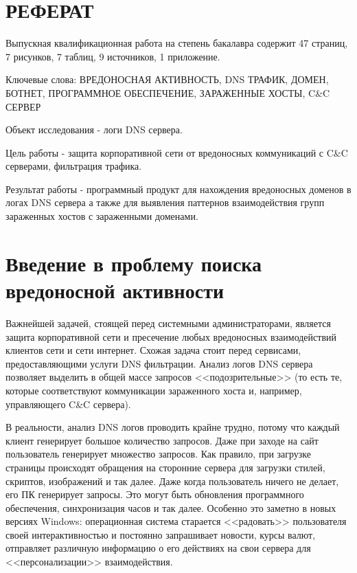 \documentclass[a4paper,14pt]{extreport} %
\begin{document}
\newpage
\clearpage
{}
\chapter*{РЕФЕРАТ}
Выпускная квалификационная работа на степень бакалавра содержит 47 страниц, 7 рисунков, 7 таблиц, 9 источников, 1 приложение.
\newline

Ключевые слова: ВРЕДОНОСНАЯ АКТИВНОСТЬ, DNS ТРАФИК, ДОМЕН, БОТНЕТ, ПРОГРАММНОЕ ОБЕСПЕЧЕНИЕ, ЗАРАЖЕННЫЕ ХОСТЫ, C\&C СЕРВЕР
\newline

Объект исследования - логи DNS сервера.

Цель работы - защита корпоративной сети от вредоносных коммуникаций с C\&C серверами, фильтрация трафика.

Результат работы - программный продукт для нахождения вредоносных доменов в логах DNS сервера а также для выявления паттернов взаимодействия групп зараженных хостов с зараженными доменами.


\renewcommand\contentsname{Содержание}

\tableofcontents



\chapter{Введение в проблему поиска вредоносной активности}

Важнейшей задачей, стоящей перед системными администраторами, является защита корпоративной сети и пресечение любых вредоносных взаимодействий клиентов сети и сети интернет. Схожая задача стоит перед сервисами, предоставляющими услуги DNS фильтрации. Анализ логов DNS сервера позволяет выделить в общей массе запросов <<подозрительные>> (то есть те, которые соответствуют коммуникации зараженного хоста и, например, управляющего C\&C сервера). 

В реальности, анализ DNS логов проводить крайне трудно, потому что каждый клиент генерирует большое количество запросов. Даже при заходе на сайт пользователь генерирует множество запросов. Как правило, при загрузке страницы происходят обращения на сторонние сервера для загрузки стилей, скриптов, изображений и так далее. Даже когда пользователь ничего не делает, его ПК генерирует запросы. Это могут быть обновления программного обеспечения, синхронизация часов и так далее. Особенно это заметно в новых версиях Windows: операционная система старается <<радовать>> пользователя своей интерактивностью и постоянно запрашивает новости, курсы валют, отправляет различную информацию о его действиях на свои сервера для <<персонализации>> взаимодействия.
\end{document}
